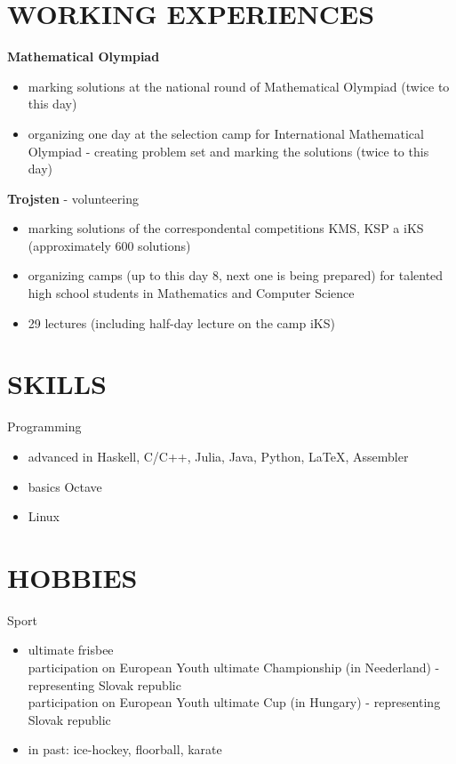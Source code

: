 \documentclass[margin, 10pt]{res} %
\begin{document}
\begin{resume}
\section{WORKING EXPERIENCES}
\textbf{Mathematical Olympiad}
\begin{itemize}  \itemsep -2pt %
\item marking solutions at the national round of Mathematical Olympiad (twice to this day)
\item organizing one day at the selection camp for International Mathematical Olympiad - creating problem set and marking the solutions (twice to this day)
\end{itemize}
\textbf{Trojsten} - volunteering
\begin{itemize} \itemsep -2pt %
\item marking solutions of the correspondental competitions KMS, KSP a iKS (approximately 600 solutions)
\item organizing camps (up to this day 8, next one is being prepared) for talented high school students in Mathematics and Computer Science
\item 29 lectures (including half-day lecture on the camp iKS)
\end{itemize}


\section{SKILLS}

Programming
\begin{itemize} \itemsep -2pt
\item advanced in Haskell, C/C++, Julia, Java, Python, \LaTeX, Assembler
\item basics Octave
\item Linux
\end{itemize}

\section{HOBBIES} 
Sport
\begin{itemize} \itemsep -2pt
\item ultimate frisbee \\
 participation on European Youth ultimate Championship (in Neederland) - representing Slovak republic\\
 participation on European Youth ultimate Cup (in Hungary) - representing Slovak republic
\item in past: ice-hockey, floorball, karate
\end{itemize}


\end{resume}
\end{document}
